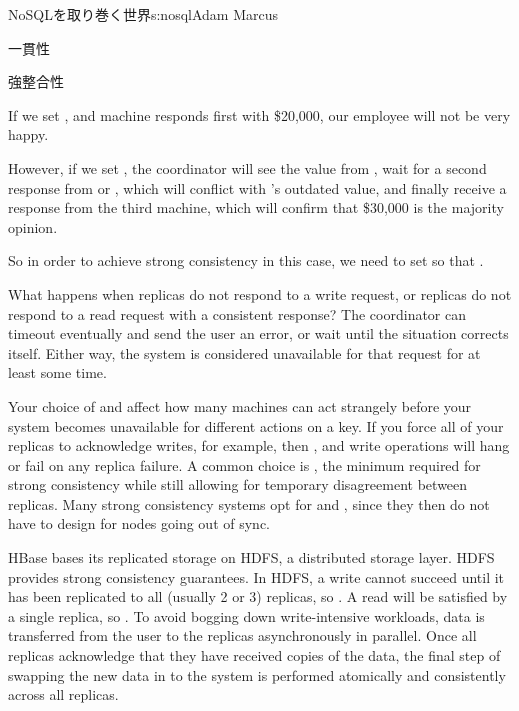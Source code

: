 \begin{aosachapter}{NoSQLを取り巻く世界}{s:nosql}{Adam Marcus}
\begin{aosasect1}{一貫性}
\begin{aosasect2}{強整合性}
\begin{aosaitemize}

  \item If we set , and machine  responds first with
  \$20,000, our employee will not be very happy.

  \item However, if we set , the coordinator will see the
  value from , wait for a second response from  or
  , which will conflict with 's outdated value, and
  finally receive a response from the third machine, which will
  confirm that \$30,000 is the majority opinion.

\end{aosaitemize}

So in order to achieve strong consistency in this case, we need to set
 so that .

What happens when  replicas do not respond to a write request,
or  replicas do not respond to a read request with a
consistent response?  The coordinator can timeout eventually and send
the user an error, or wait until the situation corrects itself.
Either way, the system is considered unavailable for that request for
at least some time.

Your choice of  and  affect how many machines can act
strangely before your system becomes unavailable for different actions
on a key.  If you force all of your replicas to acknowledge writes,
for example, then , and write operations will hang or fail
on any replica failure.  A common choice is ,
the minimum required for strong consistency while still allowing for
temporary disagreement between replicas.  Many strong consistency
systems opt for  and , since they then do not have
to design for nodes going out of sync.

HBase bases its replicated storage on HDFS, a distributed storage layer.  HDFS provides strong consistency
guarantees.  In HDFS, a write cannot succeed until it has been
replicated to all  (usually 2 or 3) replicas, so .
A read will be satisfied by a single replica, so .  To
avoid bogging down write-intensive workloads, data is transferred from
the user to the replicas asynchronously in parallel.  Once all
replicas acknowledge that they have received copies of the data, the
final step of swapping the new data in to the system is performed
atomically and consistently across all replicas.


\end{aosasect2}
\end{aosasect1}
\end{aosachapter}
